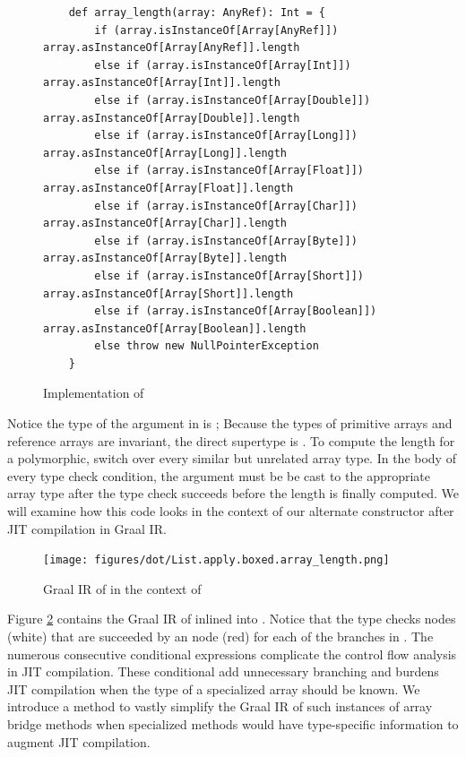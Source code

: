 \begin{figure}[!htb]
	\begin{verbatim}
	def array_length(array: AnyRef): Int = {
		if (array.isInstanceOf[Array[AnyRef]])       array.asInstanceOf[Array[AnyRef]].length
		else if (array.isInstanceOf[Array[Int]])     array.asInstanceOf[Array[Int]].length
		else if (array.isInstanceOf[Array[Double]])  array.asInstanceOf[Array[Double]].length
		else if (array.isInstanceOf[Array[Long]])    array.asInstanceOf[Array[Long]].length
		else if (array.isInstanceOf[Array[Float]])   array.asInstanceOf[Array[Float]].length
		else if (array.isInstanceOf[Array[Char]])    array.asInstanceOf[Array[Char]].length
		else if (array.isInstanceOf[Array[Byte]])    array.asInstanceOf[Array[Byte]].length
		else if (array.isInstanceOf[Array[Short]])   array.asInstanceOf[Array[Short]].length
		else if (array.isInstanceOf[Array[Boolean]]) array.asInstanceOf[Array[Boolean]].length
		else throw new NullPointerException
	}
	\end{verbatim}
	\caption{Implementation of }
	\label{impl:array-length}
\end{figure}

Notice the type of the argument in  is ; Because the types of primitive arrays and reference arrays are invariant, the direct supertype is .
To compute the length for a polymorphic,  switch over every similar but unrelated array type.
In the body of every type check condition, the argument must be be cast to the appropriate array type after the type check succeeds before the length is finally computed.
We will examine how this code looks in the context of our alternate constructor after JIT compilation in Graal IR.

\begin{figure}
	\centering
	\texttt{[image: figures/dot/List.apply.boxed.array\_length.png]}
	\caption{Graal IR of  in the context of }
	\label{graalir:list-apply-boxed-array-length}
\end{figure}

Figure \ref{graalir:list-apply-boxed-array-length} contains the Graal IR of  inlined into . 
Notice that the  type checks nodes (white) that are succeeded by an  node (red) for each of the branches in .
The numerous consecutive conditional expressions complicate the control flow analysis in JIT compilation.
These conditional add unnecessary branching and burdens JIT compilation when the type of a specialized array should be known.
We introduce a method to vastly simplify the Graal IR of such instances of array bridge methods when specialized methods would have type-specific information to augment JIT compilation.

